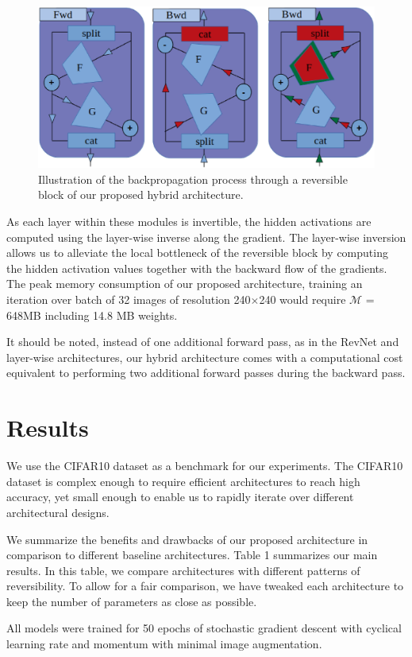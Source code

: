 \documentclass[10pt,twocolumn,letterpaper]{article}
\begin{document}
\begin{figure}[h]
\begin{center}
\includegraphics[width=0.5\linewidth]{Figure4.eps}
\end{center}
   \caption{Illustration of the backpropagation process through a
reversible block of our proposed hybrid architecture.}
\end{figure}
As each layer within these modules is invertible, the hidden activations are computed using the layer-wise inverse along the gradient. The layer-wise inversion allows us to alleviate the local bottleneck of the reversible block by computing the hidden activation values together with the backward flow of the gradients. The peak memory consumption of our proposed architecture, training an iteration over batch of 32 images of resolution 240$\times$240 would require $\mathcal{M}$ = 648MB including 14.8 MB weights.

It should be noted, instead of one additional forward pass, as in the RevNet and layer-wise architectures, our hybrid architecture comes with a computational cost equivalent to performing two additional forward passes during the backward pass. 

\section{Results} 
We use the CIFAR10 dataset as a benchmark for our experiments. The CIFAR10 dataset is complex enough to require efficient architectures to reach high accuracy, yet small enough to enable us to rapidly iterate over different architectural designs. 

We summarize the benefits and drawbacks of our proposed architecture in comparison to different baseline architectures. Table 1 summarizes our main results. In this table, we compare architectures with different patterns of reversibility. To allow for a fair comparison, we have tweaked each architecture to keep the number of parameters as close as possible.

All models were trained for 50 epochs of stochastic gradient descent with cyclical learning rate and momentum with minimal image augmentation.
\end{document}
